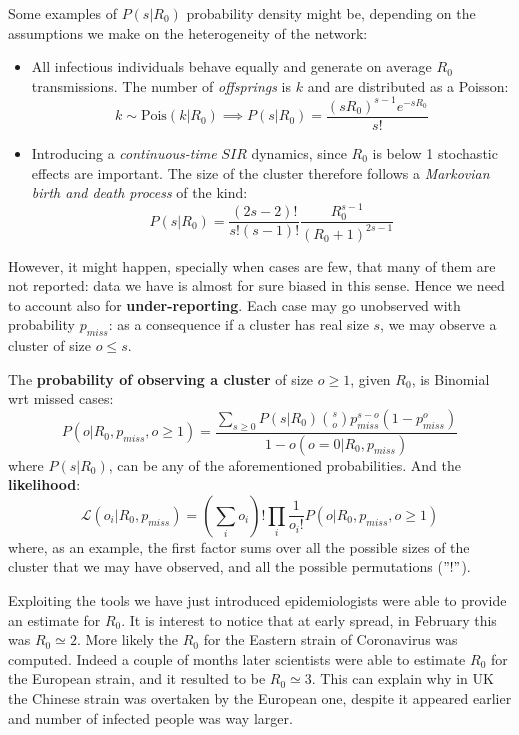 \documentclass[../main/main.tex]{subfiles}
\begin{document}
Some examples of $P(s|R_0)$ probability density might be, depending on the assumptions we make on the heterogeneity of the network:
\begin{itemize}
    \item All infectious individuals behave equally and generate on average $R_0$ transmissions. The number of \textit{offsprings} is $k$ and are distributed as a Poisson:
    \begin{equation*}
        k \sim \text{Pois}(k|R_0) \implies P(s|R_0) = \frac{(sR_0)^{s-1}e^{-sR_0}}{s!}
    \end{equation*}
    \item Introducing a \textit{continuous-time} $SIR$ dynamics, since $R_0$ is below 1 stochastic effects are important. The size of the cluster therefore follows a \textit{Markovian birth and death process} of the kind:
    \begin{equation*}
        P(s|R_0) = \frac{(2s - 2)!}{s!(s-1)!} \frac{R_0^{s-1}}{(R_0 + 1)^{2s-1}}
    \end{equation*}
\end{itemize}
However, it might happen, specially when cases are few, that many of them are not reported: data we have is almost for sure biased in this sense. Hence we need to account also for \textbf{under-reporting}. Each case may go unobserved with probability $p_{miss}$: as a consequence if a cluster has real size $s$, we may observe a cluster of size $o \leqslant s$.

The \textbf{probability of observing a cluster} of size $o \geqslant 1$, given $R_0$, is Binomial wrt missed cases:
\begin{equation*}
    P(o|R_0, p_{miss}, o\geqslant1) = \frac{\sum_{s\geqslant 0} P(s|R_0) \binom{s}{o}p_{miss}^{s-o}(1-p_{miss}^o)}{1-o(o=0|R_0, p_{miss})}
\end{equation*}
where $P(s|R_0)$, can be any of the aforementioned probabilities. And the \textbf{likelihood}:
\begin{equation*}
    \mathcal{L}(o_i|R_0, p_{miss}) = \left( \sum_i o_i \right)! \prod_i \frac{1}{o_i !} P(o|R_0, p_{miss}, o\geqslant 1)
\end{equation*}
where, as an example, the first factor sums over all the possible sizes of the cluster that we may have observed, and all the possible permutations ($"!"$).

Exploiting the tools we have just introduced epidemiologists were able to provide an estimate for $R_0$. It is interest to notice that at early spread, in February this was $R_0 \simeq 2$. More likely the $R_0$ for the Eastern strain of Coronavirus was computed. Indeed a couple of months later scientists were able to estimate $R_0$ for the European strain, and it resulted to be $R_0 \simeq 3$. This can explain why in UK the Chinese strain was overtaken by the European one, despite it appeared earlier and number of infected people was way larger.
\end{document}
